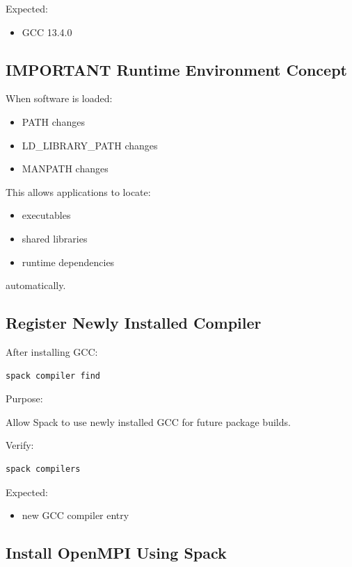 \documentclass[11pt]{article}
\begin{document}
Expected:
\begin{itemize}
\item GCC 13.4.0
\end{itemize}
\subsection{IMPORTANT Runtime Environment Concept}
\label{sec:org7b33dcd}

When software is loaded:

\begin{itemize}
\item PATH changes
\item LD\_LIBRARY\_PATH changes
\item MANPATH changes
\end{itemize}

This allows applications to locate:

\begin{itemize}
\item executables
\item shared libraries
\item runtime dependencies
\end{itemize}

automatically.
\subsection{Register Newly Installed Compiler}
\label{sec:org559f641}

After installing GCC:

\begin{verbatim}
spack compiler find
\end{verbatim}

Purpose:

Allow Spack to use newly installed GCC for future package builds.

Verify:

\begin{verbatim}
spack compilers
\end{verbatim}

Expected:
\begin{itemize}
\item new GCC compiler entry
\end{itemize}
\subsection{Install OpenMPI Using Spack}
\label{sec:org2baa15b}
\end{document}
